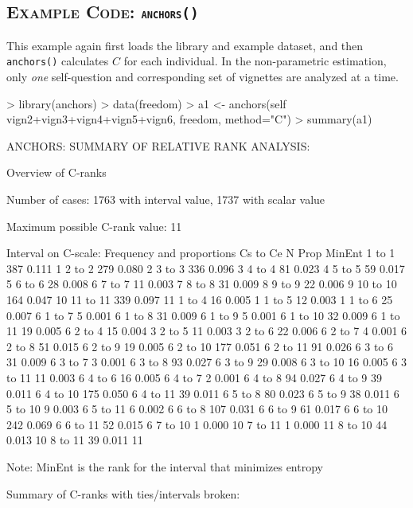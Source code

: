 \documentclass{amsart}
\newcommand{\code}[1]{{\texttt{#1}}}
\newcommand{\ssubsection}[2]{%
  \subsection[#1]{\normalfont\scshape #1: {\tt #2}}}
\begin{document}
\ssubsection{Example Code}{anchors()}
This example again first loads the library and example dataset, and
then \code{anchors()} calculates $C$ for each individual.  In the
non-parametric estimation, only \emph{one} self-question and
corresponding set of vignettes are analyzed at a time.
\begin{Schunk}
\begin{Sinput}
> library(anchors)
> data(freedom)
> a1 <- anchors(self ~ vign2+vign3+vign4+vign5+vign6, freedom, method="C")
> summary(a1)
\end{Sinput}
\begin{Soutput}
ANCHORS: SUMMARY OF RELATIVE RANK ANALYSIS:

Overview of C-ranks

Number of cases: 1763 with interval value, 1737 with scalar value

Maximum possible C-rank value: 11

Interval on C-scale: Frequency and proportions Cs to Ce
           N  Prop MinEnt
 1 to  1 387 0.111      1
 2 to  2 279 0.080      2
 3 to  3 336 0.096      3
 4 to  4  81 0.023      4
 5 to  5  59 0.017      5
 6 to  6  28 0.008      6
 7 to  7  11 0.003      7
 8 to  8  31 0.009      8
 9 to  9  22 0.006      9
10 to 10 164 0.047     10
11 to 11 339 0.097     11
 1 to  4  16 0.005      1
 1 to  5  12 0.003      1
 1 to  6  25 0.007      6
 1 to  7   5 0.001      6
 1 to  8  31 0.009      6
 1 to  9   5 0.001      6
 1 to 10  32 0.009      6
 1 to 11  19 0.005      6
 2 to  4  15 0.004      3
 2 to  5  11 0.003      3
 2 to  6  22 0.006      6
 2 to  7   4 0.001      6
 2 to  8  51 0.015      6
 2 to  9  19 0.005      6
 2 to 10 177 0.051      6
 2 to 11  91 0.026      6
 3 to  6  31 0.009      6
 3 to  7   3 0.001      6
 3 to  8  93 0.027      6
 3 to  9  29 0.008      6
 3 to 10  16 0.005      6
 3 to 11  11 0.003      6
 4 to  6  16 0.005      6
 4 to  7   2 0.001      6
 4 to  8  94 0.027      6
 4 to  9  39 0.011      6
 4 to 10 175 0.050      6
 4 to 11  39 0.011      6
 5 to  8  80 0.023      6
 5 to  9  38 0.011      6
 5 to 10   9 0.003      6
 5 to 11   6 0.002      6
 6 to  8 107 0.031      6
 6 to  9  61 0.017      6
 6 to 10 242 0.069      6
 6 to 11  52 0.015      6
 7 to 10   1 0.000     10
 7 to 11   1 0.000     11
 8 to 10  44 0.013     10
 8 to 11  39 0.011     11

Note: MinEnt is the rank for the interval that minimizes entropy

Summary of C-ranks with ties/intervals broken:


\end{Soutput}
\end{Schunk}
\end{document}
